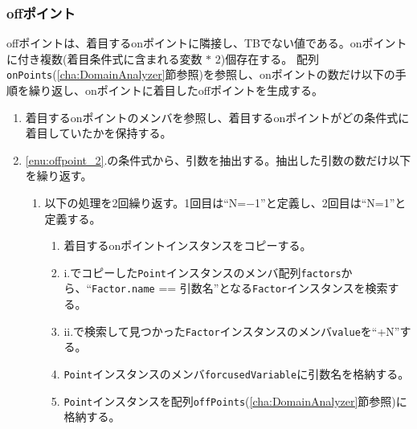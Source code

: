 \documentclass[uplatex, report, a4j, 10pt]{jsbook}
\newcommand\ttt[1]{\texttt{#1}}
\begin{document}
\subsubsection{offポイント}
offポイントは、着目するonポイントに隣接し、TBでない値である。onポイントに付き複数(着目条件式に含まれる変数 $*$ 2)個存在する。
配列\ttt{onPoints}(\ref{cha:DomainAnalyzer}節参照)を参照し、onポイントの数だけ以下の手順を繰り返し、onポイントに着目したoffポイントを生成する。
\begin{enumerate}
  \item\label{enu:offpoint_2} 着目するonポイントのメンバ\forcusedConditionalExpression{}を参照し、着目するonポイントがどの条件式に着目していたかを保持する。
  \item \ref{enu:offpoint_2}.の条件式から、引数を抽出する。抽出した引数の数だけ以下を繰り返す。
        \begin{enumerate}
          \item 以下の処理を2回繰り返す。1回目は“N=$-$1”と定義し、2回目は“N=1”と定義する。
                \begin{enumerate}
                  \item\label{enu:offpoint_3} 着目するonポイントインスタンスをコピーする。
                  \item\label{enu:offpoint_1} i.でコピーした\ttt{Point}インスタンスのメンバ配列\ttt{factors}から、“\ttt{Factor.name} == 引数名”となる\ttt{Factor}インスタンスを検索する。
                  \item ii.で検索して見つかった\ttt{Factor}インスタンスのメンバ\ttt{value}を“+N”する。
                  \item \ttt{Point}インスタンスのメンバ\ttt{forcusedVariable}に引数名を格納する。
                  \item \ttt{Point}インスタンスを配列\ttt{offPoints}(\ref{cha:DomainAnalyzer}節参照)に格納する。
                \end{enumerate}
        \end{enumerate}
\end{enumerate}
\end{document}
